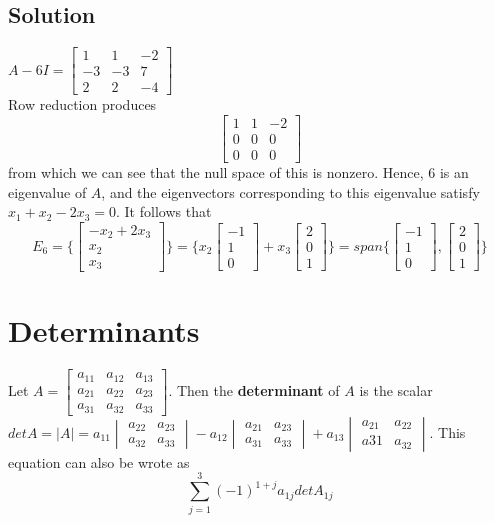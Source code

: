 \subsection*{Solution}
$A - 6I = \begin{bmatrix}
    1&1&-2\\-3&-3&7\\2&2&-4
\end{bmatrix}$\\ Row reduction produces $$\begin{bmatrix}
    1&1&-2\\0&0&0\\0&0&0
\end{bmatrix}$$ from which we can see that the null space of this is nonzero. Hence, 6 is an eigenvalue of $A$, and the eigenvectors corresponding to this eigenvalue satisfy $x_1+x_2-2x_3 = 0$. It follows that
$$E_6 = \{\begin{bmatrix}
    -x_2+2x_3\\x_2\\x_3
\end{bmatrix}\} = \{x_2\begin{bmatrix}
    -1\\1\\0
\end{bmatrix} + x_3\begin{bmatrix}
    2\\0\\1
\end{bmatrix}\} = span\{\begin{bmatrix}
    -1\\1\\0
\end{bmatrix}, \begin{bmatrix}
    2\\0\\1
\end{bmatrix}\}$$

\section{Determinants}
Let $A = \begin{bmatrix}
    a_{11}&a_{12}&a_{13}\\a_{21}&a_{22}&a_{23}\\a_{31}&a_{32}&a_{33}
\end{bmatrix}$. Then the \textbf{determinant} of $A$ is the scalar\\
$det A = |A| = a_{11}\begin{vmatrix}
    a_{22}&a_{23}\\a_{32}&a_{33}
\end{vmatrix} - a_{12}\begin{vmatrix}
    a_{21}&a_{23}\\a_{31}&a_{33}
\end{vmatrix} + a_{13}\begin{vmatrix}
    a_{21}&a_{22}\\a{31}&a_{32}
\end{vmatrix}$. This equation can also be wrote as 
$$\sum^3_{j=1} (-1)^{1+j}a_{1j}detA_{1j}$$

